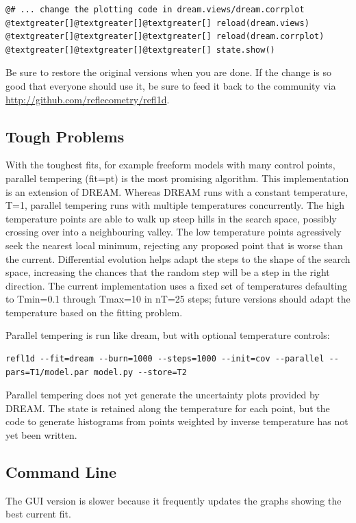 \documentclass[letterpaper,10pt,english]{sphinxmanual}
\begin{document}
\begin{Verbatim}[commandchars=@\[\]]
@# ... change the plotting code in dream.views/dream.corrplot
@textgreater[]@textgreater[]@textgreater[] reload(dream.views)
@textgreater[]@textgreater[]@textgreater[] reload(dream.corrplot)
@textgreater[]@textgreater[]@textgreater[] state.show()
\end{Verbatim}

Be sure to restore the original versions when you are done.  If the change
is so good that everyone should use it, be sure to feed it back to the
community via \href{http://github.com/reflecometry/refl1d}{http://github.com/reflecometry/refl1d}.


\subsection{Tough Problems}
\label{guide/fitting:tough-problems}
With the toughest fits, for example freeform models with many control
points, parallel tempering (fit=pt) is the most promising algorithm.  This
implementation is an extension of DREAM.  Whereas DREAM runs with a
constant temperature, T=1, parallel tempering runs with multiple
temperatures concurrently.   The high temperature points are able to walk
up steep hills in the search space, possibly crossing over into a
neighbouring valley.  The low temperature points agressively seek the
nearest local minimum, rejecting any proposed point that is worse than
the current.  Differential evolution helps adapt the steps to the shape
of the search space, increasing the chances that the random step will be
a step in the right direction.  The current implementation uses a fixed
set of temperatures defaulting to Tmin=0.1 through Tmax=10 in nT=25 steps;
future versions should adapt the temperature based on the fitting problem.

Parallel tempering is run like dream, but with optional temperature
controls:

\begin{Verbatim}[commandchars=@\[\]]
refl1d --fit=dream --burn=1000 --steps=1000 --init=cov --parallel --pars=T1/model.par model.py --store=T2
\end{Verbatim}

Parallel tempering does not yet generate the uncertainty plots provided
by DREAM.  The state is retained along the temperature for each point,
but the code to generate histograms from points weighted by inverse
temperature has not yet been written.


\subsection{Command Line}
\label{guide/fitting:command-line}
The GUI version is slower because it frequently updates the graphs
showing the best current fit.
\end{document}
